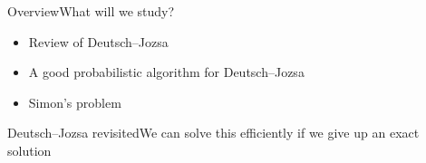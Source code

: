 
\begin{frame}{Overview}{What will we study?}

\begin{itemize}[<+->]
    \item Review of Deutsch--Jozsa
    \item A good probabilistic algorithm for Deutsch--Jozsa
    \item Simon's problem
\end{itemize}

\end{frame}

\begin{frame}{Deutsch--Jozsa revisited}{We can solve this efficiently if we give up an exact solution}


\end{frame}
